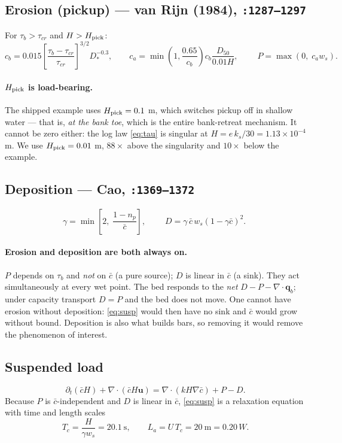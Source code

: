 \documentclass[11pt,a4paper]{article}
\newcommand{\dt}{\partial_t}
\newcommand{\code}[1]{\texttt{\small #1}}
\begin{document}
\subsection{Erosion (pickup) --- van Rijn (1984), \code{:1287--1297}}
For $\tau_b>\tau_{cr}$ and $H>H_{\rm pick}$:
\begin{equation}
  c_b=0.015\left[\frac{\tau_b-\tau_{cr}}{\tau_{cr}}\right]^{3/2}D_*^{-0.3},
  \qquad
  c_a=\min\!\left(1,\frac{0.65}{c_b}\right)c_b\frac{D_{50}}{0.01H},
  \qquad
  \boxed{\;P=\max\left(0,\;c_a w_s\right).\;}
  \label{eq:pickup}
\end{equation}

\paragraph{$H_{\rm pick}$ is load-bearing.} The shipped example uses
$H_{\rm pick}=0.1$ m, which switches pickup off in shallow water --- that is, \emph{at the
bank toe}, which is the entire bank-retreat mechanism. It cannot be zero either: the log
law \eqref{eq:tau} is singular at $H=e\,k_s/30=1.13\times10^{-4}$ m. We use
$H_{\rm pick}=0.01$ m, $88\times$ above the singularity and $10\times$ below the example.

\subsection{Deposition --- Cao, \code{:1369--1372}}
\begin{equation}
  \gamma=\min\!\left[2,\;\frac{1-n_p}{\bar c}\right],
  \qquad
  \boxed{\;D=\gamma\,\bar c\,w_s\left(1-\gamma\bar c\right)^{2}.\;}
  \label{eq:depo}
\end{equation}

\paragraph{Erosion and deposition are both always on.} $P$ depends on $\tau_b$ and
\emph{not} on $\bar c$ (a pure source); $D$ is linear in $\bar c$ (a sink). They act
simultaneously at every wet point. The bed responds to the \emph{net} $D-P-\nabla\!\cdot\!\bm q_b$;
under capacity transport $D=P$ and the bed does not move. One cannot have erosion without
deposition: \eqref{eq:susp} would then have no sink and $\bar c$ would grow without bound.
Deposition is also what builds bars, so removing it would remove the phenomenon of interest.

\subsection{Suspended load}
\begin{equation}
  \dt\!\left(\bar c H\right) + \nabla\!\cdot\!\left(\bar c H\bm u\right)
  = \nabla\!\cdot\!\left(k H\nabla\bar c\right) + P - D .
  \label{eq:susp}
\end{equation}
Because $P$ is $\bar c$-independent and $D$ is linear in $\bar c$, \eqref{eq:susp} is a
relaxation equation with time and length scales
\begin{equation}
  T_c=\frac{H}{\gamma w_s}=20.1\ \mathrm{s},
  \qquad
  L_a=U\,T_c=20\ \mathrm{m}=0.20\,W .
  \label{eq:Tc}
\end{equation}
\end{document}
